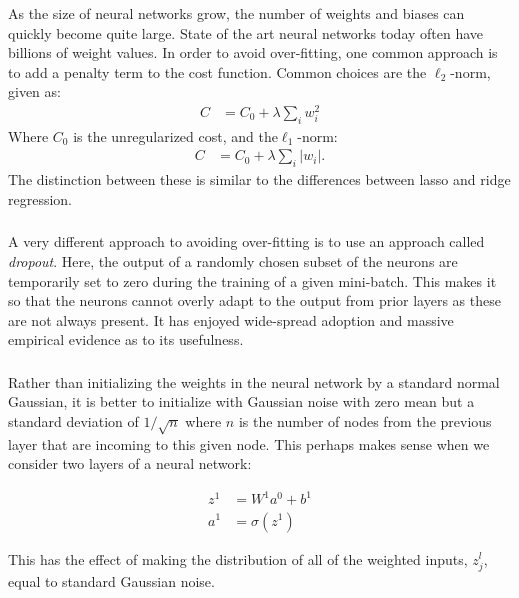 \documentclass[xetex,mathserif,serif,aspectratio=169]{beamer}
\begin{document}
\begin{frame}[fragile] \frametitle{} \oldB \small

\textbf{}

As the size of neural networks grow, the number of weights and biases can
quickly become quite large. State of the art neural networks today often
have billions of weight values. In order to avoid over-fitting, one common
approach is to add a penalty term to the cost function. Common choices are
the $\ell_2$-norm, given as:
\begin{align*}
C &= C_0 + \lambda \sum_i w_i^2
\end{align*}
Where $C_0$ is the unregularized cost, and the$\ell_1$-norm:
\begin{align*}
C &= C_0 + \lambda \sum_i |w_i|.
\end{align*}
The distinction between these is similar to the differences between lasso and
ridge regression.

\end{frame}

\begin{frame}[fragile] \frametitle{} \oldB \small

\textbf{}

A very different approach to avoiding over-fitting is to use an approach called
\textit{dropout}. Here, the output of a randomly chosen subset of the neurons
are temporarily set to zero during the training of a given mini-batch. This makes
it so that the neurons cannot overly adapt to the output from prior layers as
these are not always present. It has enjoyed wide-spread adoption and massive
empirical evidence as to its usefulness.

\end{frame}

\begin{frame}[fragile] \frametitle{} \oldB \small

\textbf{}

Rather than initializing the weights in the neural network by a standard normal
Gaussian, it is better to initialize with Gaussian noise with zero mean but a
standard deviation of $1 / \sqrt{n}$ where $n$ is the number of nodes from the
previous layer that are incoming to this given node. This perhaps makes sense
when we consider two layers of a neural network:

\begin{align}
z^1 &= W^1 a^0 + b^1 \\
a^1 &= \sigma(z^1)
\end{align}

This has the effect of making the distribution of all of the weighted inputs, $z_j^l$,
equal to standard Gaussian noise.

\end{frame}
\end{document}
